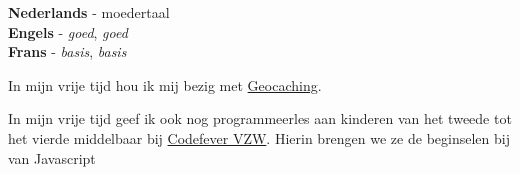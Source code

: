 \documentclass[9pt]{developercv} %
\begin{document}

\begin{minipage}[t]{0.3\textwidth}
	\vspace{-\baselineskip} %

	
	\textbf{Nederlands} - moedertaal\\
	\textbf{Engels} -   \textit{goed},  \textit{goed}\\
	\textbf{Frans} -   \textit{basis},  \textit{basis}
\end{minipage}
\hfill
\begin{minipage}[t]{0.3\textwidth}
	\vspace{-\baselineskip} %
	
	
	In mijn vrije tijd hou ik mij bezig met \href{https://www.geocaching.com/}{Geocaching}.
\end{minipage}
\hfill
\begin{minipage}[t]{0.3\textwidth}
	\vspace{-\baselineskip} %
	
	
	In mijn vrije tijd geef ik ook nog programmeerles aan kinderen van het tweede tot het vierde middelbaar bij \href{https://www.codefever.be/nl}{Codefever VZW}. Hierin brengen we ze de beginselen bij van Javascript
\end{minipage}

\end{document}
